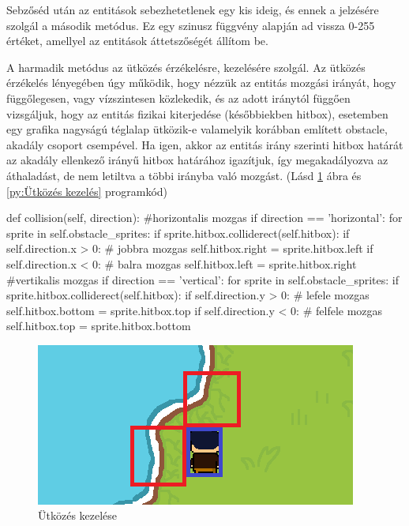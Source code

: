 Sebzőséd után az entitások sebezhetetlenek egy kis ideig, és ennek a jelzésére szolgál a második metódus. Ez egy szinusz függvény alapján ad vissza 0-255 értéket, amellyel az entitások áttetszőségét állítom be.

A harmadik metódus az ütközés érzékelésre, kezelésére szolgál.
Az ütközés érzékelés lényegében úgy működik, hogy nézzük az entitás mozgási irányát, hogy függőlegesen, vagy vízszintesen közlekedik, és az adott iránytól függően vizsgáljuk, hogy az entitás fizikai kiterjedése (későbbiekben hitbox), esetemben egy grafika nagyságú téglalap ütközik-e valamelyik korábban említett obstacle, akadály csoport csempével. Ha igen, akkor az entitás irány szerinti hitbox határát az akadály ellenkező irányű hitbox határához igazítjuk, így megakadályozva az áthaladást, de nem letiltva a többi irányba való mozgást. (Lásd \ref{fig:Ütközés kezelése} ábra és \ref{py:Ütközés kezelés} programkód)




\begin{python}[caption={Ütközés kezelése},label=py:Ütközés kezelés]
def collision(self, direction):
    #horizontalis mozgas
    if direction == 'horizontal':
        for sprite in self.obstacle_sprites:
            if sprite.hitbox.colliderect(self.hitbox):
                if self.direction.x > 0:
                # jobbra mozgas
                    self.hitbox.right = sprite.hitbox.left
                if self.direction.x < 0:
                # balra mozgas
                    self.hitbox.left = sprite.hitbox.right                   
    #vertikalis mozgas
    if direction == 'vertical':
        for sprite in self.obstacle_sprites:
            if sprite.hitbox.colliderect(self.hitbox):
                    if self.direction.y > 0:
                        # lefele mozgas
                        self.hitbox.bottom = sprite.hitbox.top
                        if self.direction.y < 0:
                        # felfele mozgas
                        self.hitbox.top = sprite.hitbox.bottom
                    \end{python} 


                    \begin{figure}[H]
                        \centering
                        \includegraphics[width=12.0truecm]{images/collision.png}
                        \caption{Ütközés kezelése}
                        \label{fig:Ütközés kezelése}
                    \end{figure}
                    
